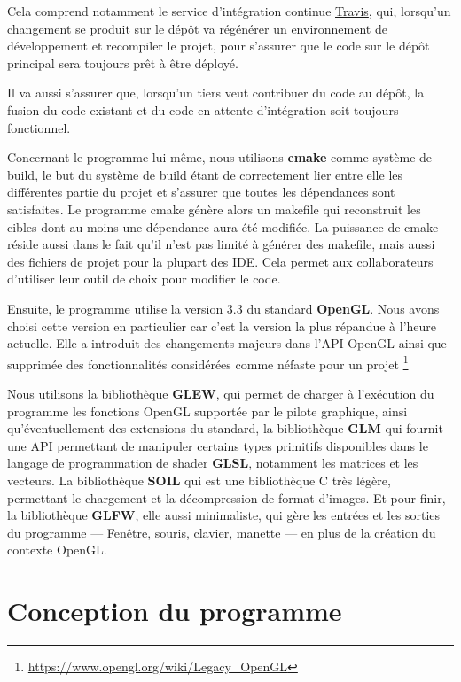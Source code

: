 \documentclass[11pt, a4paper, titlepage]{article}
\begin{document}
Cela comprend notamment le service d'intégration continue
\href{https://travis-ci.org/nbouteme/OpenGL-Demo}{{\color{blue}Travis}},
qui, lorsqu'un changement se produit sur le dépôt va régénérer un
environnement de développement et recompiler le projet, pour s'assurer
que le code sur le dépôt principal sera toujours prêt à être déployé.

Il va aussi s'assurer que, lorsqu'un tiers veut contribuer du code au
dépôt, la fusion du code existant et du code en attente d'intégration
soit toujours fonctionnel.

Concernant le programme lui-même, nous utilisons \textbf{cmake} comme
système de build, le but du système de build étant de correctement
lier entre elle les différentes partie du projet et s'assurer que
toutes les dépendances sont satisfaites. Le programme cmake génère
alors un makefile qui reconstruit les cibles dont au moins une
dépendance aura été modifiée. La puissance de cmake réside aussi dans
le fait qu'il n'est pas limité à générer des makefile, mais aussi des
fichiers de projet pour la plupart des IDE. Cela permet aux
collaborateurs d'utiliser leur outil de choix pour modifier le code.

Ensuite, le programme utilise la version 3.3 du standard
\textbf{OpenGL}.  Nous avons choisi cette version en particulier car
c'est la version la plus répandue à l'heure actuelle. Elle a introduit
des changements majeurs dans l'API OpenGL ainsi que supprimée des
fonctionnalités considérées comme néfaste pour un projet
\footnote{\url{https://www.opengl.org/wiki/Legacy_OpenGL}}

Nous utilisons la bibliothèque \textbf{GLEW}, qui permet de charger à
l'exécution du programme les fonctions OpenGL supportée par le pilote
graphique, ainsi qu'éventuellement des extensions du standard, la
bibliothèque \textbf{GLM} qui fournit une API permettant de manipuler
certains types primitifs disponibles dans le langage de programmation
de shader \textbf{GLSL}, notamment les matrices et les vecteurs. La
bibliothèque \textbf{SOIL} qui est une bibliothèque C très légère,
permettant le chargement et la décompression de format d'images. Et
pour finir, la bibliothèque \textbf{GLFW}, elle aussi minimaliste, qui
gère les entrées et les sorties du programme --- Fenêtre, souris,
clavier, manette --- en plus de la création du contexte OpenGL.

\part{Conception du programme}
\end{document}

